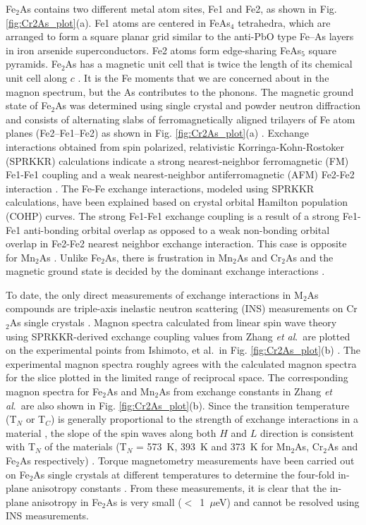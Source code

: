 \documentclass[letterpaper,10pt,doublespacing,edeposit]{uiucthesis2020}
\begin{document}
\begin{mainmatter}
Fe$_2$As contains two different metal atom sites, Fe1 and Fe2, as shown in Fig. \ref{fig:Cr2As_plot}(a). Fe1 atoms are centered in FeAs$_4$ tetrahedra, which are arranged to form a square planar grid similar to the anti-PbO type Fe--As layers in iron arsenide superconductors. 
Fe2 atoms form edge-sharing FeAs$_5$ square pyramids. 
Fe$_2$As has a magnetic unit cell that is twice the length of its chemical unit cell along $c$ \cite{Zhang2013,Katsuraki1966}.  It is the Fe moments that we are concerned about in the magnon spectrum, but the As contributes to the phonons. The magnetic ground state of Fe$_2$As was determined using single crystal and powder neutron diffraction and consists of alternating slabs of ferromagnetically aligned trilayers of Fe atom planes (Fe2--Fe1--Fe2) as shown in Fig. \ref{fig:Cr2As_plot}(a) \cite{Katsuraki1966}.
Exchange interactions obtained from  spin polarized, relativistic Korringa-Kohn-Rostoker (SPRKKR)  calculations indicate a strong nearest-neighbor ferromagnetic (FM) Fe1-Fe1 coupling and a weak nearest-neighbor antiferromagnetic (AFM) Fe2-Fe2 interaction \cite{Zhang2013}.
The Fe-Fe exchange interactions, modeled using SPRKKR calculations, have been explained based on crystal orbital Hamilton population (COHP) curves. The strong Fe1-Fe1 exchange coupling is a result of a strong Fe1-Fe1 anti-bonding orbital overlap as opposed to a weak non-bonding orbital overlap in Fe2-Fe2 nearest neighbor exchange interaction. This case is opposite for Mn$_2$As \cite{Zhang2013}.
Unlike Fe$_2$As, there is frustration in Mn$_2$As and Cr$_2$As and the magnetic ground state is decided by the dominant exchange interactions \cite{Zhang2013}.


To date, the only direct measurements of exchange interactions in M$_2$As compounds are triple-axis inelastic neutron scattering (INS) measurements on Cr$_2$As single crystals \cite{Yuzuri1960,Ishimoto1995}.
Magnon spectra calculated from linear spin wave theory using SPRKKR-derived exchange coupling values from Zhang \emph{et al}.\ are plotted on the experimental points from Ishimoto, et al.\ in Fig. \ref{fig:Cr2As_plot}(b) \cite{Zhang2013,Ishimoto1995}. The experimental magnon spectra roughly agrees with the calculated magnon spectra for the slice plotted in the limited range of reciprocal space. The corresponding magnon spectra for Fe$_2$As and Mn$_2$As from exchange constants in Zhang \emph{et al}.\ are also shown in Fig. \ref{fig:Cr2As_plot}(b). 
Since the transition temperature (T$_N$ or T$_C$) is generally proportional to the strength of exchange interactions in a material \cite{Krishnan2016}, the slope of the spin waves along both $H$ and $L$ direction is consistent with T$_N$ of the materials (T$_N$ = 573~K, 393~K and 373~K for Mn$_2$As, Cr$_2$As and Fe$_2$As respectively) \cite{Zhang2013}.
Torque magnetometry measurements have been carried out on Fe$_2$As single crystals at different temperatures to determine the four-fold in-plane anisotropy constants \cite{Yang2020,Achiwa1967}. From these measurements, it is clear that the in-plane anisotropy in Fe$_2$As is very small ($<$~1~$\mu$eV) and cannot be resolved using INS measurements. 


\end{mainmatter}
\end{document}
